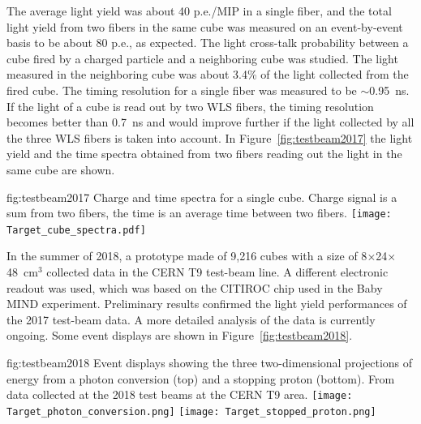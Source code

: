 The average light yield was about 40 p.e./MIP in a single fiber, and the total light yield from two fibers in the same cube was measured on an event-by-event basis to be about 80 p.e., as expected.
The light cross-talk probability between a cube fired by a charged particle and a neighboring cube was studied. The light measured in the neighboring cube was about 3.4\% of the light collected from the fired cube. 
The timing resolution for a single fiber was measured to be $\sim$0.95~ns. If the light of a cube is read out by two WLS fibers, the timing resolution becomes better than 0.7~ns and would improve further if the light collected by all the three WLS fibers is taken into account.
In Figure~\ref{fig:testbeam2017} the light yield and the time spectra obtained from two fibers reading out the light in the same cube are shown.

\begin{dunefigure}{fig:testbeam2017}
{Charge and time spectra for a single  cube. Charge signal is a sum from two fibers, the time is an average time between two fibers.}
  \texttt{[image: Target\_cube\_spectra.pdf]}
\end{dunefigure}

In the summer of 2018, a prototype made of 9,216 cubes with a size of 8$\times$24$\times$48~cm$^{3}$  collected data in the CERN T9 test-beam line.
A different electronic readout was used, which was based on the CITIROC chip used in the Baby MIND experiment.
Preliminary results confirmed the light yield performances of the 2017 test-beam data. A more detailed analysis of the data is currently ongoing.
Some event displays are shown in Figure~\ref{fig:testbeam2018}.


\begin{dunefigure}{fig:testbeam2018}
{Event displays showing the three two-dimensional projections of energy from a photon conversion (top) and a stopping proton (bottom). From data collected at the 2018 test beams at the CERN T9 area.}
\texttt{[image: Target\_photon\_conversion.png]}
\texttt{[image: Target\_stopped\_proton.png]}
\end{dunefigure}

